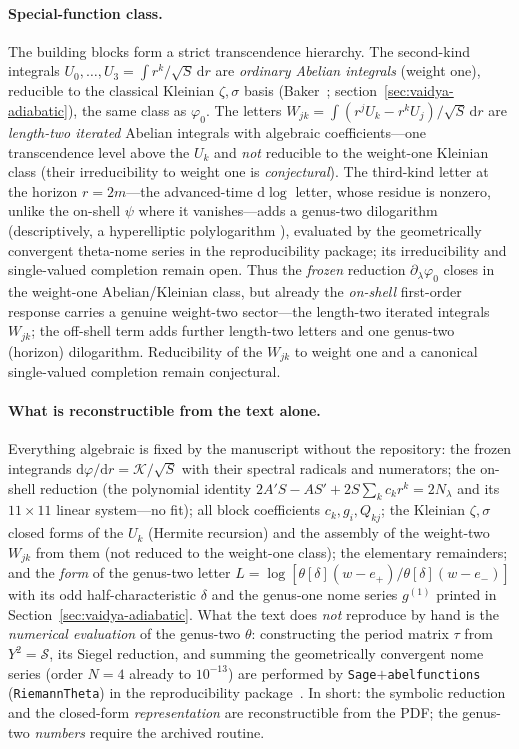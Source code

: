 \documentclass[12pt]{iopart}
\newcommand{\dd}{\mathrm{d}}
\begin{document}
\paragraph{Special-function class.} The building blocks form a strict transcendence
hierarchy. The second-kind integrals $U_0,\dots,U_3=\int r^k/\sqrt S\,\dd r$ are
\emph{ordinary Abelian integrals} (weight one), reducible to the classical Kleinian
$\zeta,\sigma$ basis (Baker~\cite{BakerAbelian1897}; section~\ref{sec:vaidya-adiabatic}),
the same class as $\varphi_0$. The letters
$W_{jk}=\int(r^jU_k-r^kU_j)/\sqrt S\,\dd r$ are \emph{length-two iterated} Abelian
integrals with algebraic coefficients---one transcendence level above the $U_k$ and
\emph{not} reducible to the weight-one Kleinian class (their irreducibility to weight one
is \emph{conjectural}). The third-kind letter at the horizon $r=2m$---the advanced-time
$\dd\log$ letter, whose residue is nonzero, unlike the on-shell $\psi$ where it
vanishes---adds a genus-two dilogarithm (descriptively, a hyperelliptic polylogarithm
\cite{BauneEtal2024,DHokerHiddingSchlotterer2025}), evaluated by the geometrically
convergent theta-nome series in the reproducibility package; its irreducibility and
single-valued completion remain open. Thus the \emph{frozen} reduction
$\partial_\lambda\varphi_0$ closes in the weight-one Abelian/Kleinian class, but already
the \emph{on-shell} first-order response carries a genuine weight-two sector---the
length-two iterated integrals $W_{jk}$; the off-shell term adds further length-two letters
and one genus-two (horizon) dilogarithm. Reducibility of the $W_{jk}$ to weight one and a
canonical single-valued completion remain conjectural.

\paragraph{What is reconstructible from the text alone.} Everything algebraic is fixed
by the manuscript without the repository: the frozen integrands
$\dd\varphi/\dd r=\mathcal K/\sqrt S$ with their spectral radicals and numerators;
the on-shell reduction (the polynomial identity $2A'S-AS'+2S\sum_k c_kr^k=2N_\lambda$
and its $11\times11$ linear system---no fit); all block coefficients $c_k,g_i,Q_{kj}$;
the Kleinian $\zeta,\sigma$ closed forms of the $U_k$ (Hermite recursion) and the assembly
of the weight-two $W_{jk}$ from them (not reduced to the weight-one class); the elementary
remainders; and the \emph{form} of the genus-two letter
$L=\log[\theta[\delta](w-e_+)/\theta[\delta](w-e_-)]$ with its odd half-characteristic
$\delta$ and the genus-one nome series $g^{(1)}$ printed in
Section~\ref{sec:vaidya-adiabatic}. What the text does \emph{not} reproduce by hand is the
\emph{numerical evaluation} of the genus-two $\theta$: constructing the period matrix
$\tau$ from $Y^2=\mathcal S$, its Siegel reduction, and summing the geometrically
convergent nome series (order $N{=}4$ already to $10^{-13}$) are performed by
\texttt{Sage}$+$\texttt{abelfunctions} (\texttt{RiemannTheta}) in the reproducibility
package~\cite{Rosignoli2026Code}. In short: the symbolic reduction and the closed-form
\emph{representation} are reconstructible from the PDF; the genus-two \emph{numbers}
require the archived routine.
\end{document}
